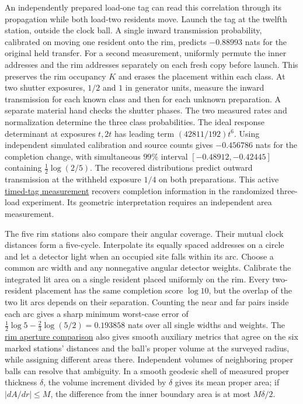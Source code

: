 \documentclass[11pt]{article}
\begin{document}
An independently prepared load-one tag can read this correlation through
its propagation while both load-two residents move. Launch the tag at the
twelfth station, outside the clock ball. A single inward transmission
probability, calibrated on moving one resident onto the rim, predicts
$-0.88993$ nats for the original held transfer. For a second measurement,
uniformly permute the inner addresses and the rim addresses separately on
each fresh copy before launch. This preserves the rim occupancy $K$ and
erases the placement within each class. At two shutter exposures,
$1/2$ and $1$ in generator units, measure the inward transmission for
each known class and then for each unknown preparation. A separate
material hand checks the shutter phases. The two measured rates and
normalization determine the three class probabilities. The ideal
response determinant at exposures $t,2t$ has leading term
$(42811/192)t^6$. Using independent simulated calibration and source
counts gives $-0.456786$ nats for the completion change, with
simultaneous $99\%$ interval $[-0.48912,-0.42445]$ containing
$\tfrac12\log(2/5)$. The recovered distributions predict outward
transmission at the withheld exposure $1/4$ on both preparations.
This active \href{https://github.com/FloatingPragma/observer-patch-holography/tree/main/model/experiments/interval_echo_einstein_station/equilibrium_refinement/tracer_flux}{timed-tag measurement}
recovers completion information in the randomized three-load experiment.
Its geometric interpretation requires an independent area measurement.

The five rim stations also compare their angular coverage. Their mutual
clock distances form a five-cycle. Interpolate its equally spaced
addresses on a circle and let a detector light when an occupied site
falls within its arc. Choose a common arc width and any nonnegative
angular detector weights. Calibrate the integrated lit area on a
single resident placed uniformly on the rim. Every two-resident
placement has the same completion score $\log 10$, but the overlap of
the two lit arcs depends on their separation. Counting the near and
far pairs inside each arc gives a sharp minimum worst-case error of
$\tfrac12\log 5-\tfrac23\log(5/2)=0.193858$ nats over all single
widths and weights. The
\href{https://github.com/FloatingPragma/observer-patch-holography/tree/main/model/experiments/interval_echo_einstein_station/equilibrium_refinement/rim_geometry}{rim aperture comparison}
also gives smooth auxiliary metrics that agree on the six marked
stations' distances and the ball's proper volume at the surveyed
radius, while assigning different areas there. Independent volumes of
neighboring proper balls can resolve that ambiguity. In a smooth
geodesic shell of measured proper thickness $\delta$, the volume
increment divided by $\delta$ gives its mean proper area; if
$|dA/dr|\le M$, the difference from the inner boundary area is at most
$M\delta/2$.
\end{document}
